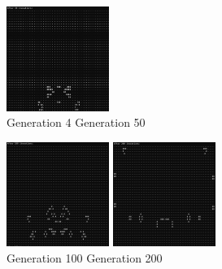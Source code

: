 \documentclass{article}
\begin{document}
\begin{enumerate}[a)]
\begin{center}
        \includegraphics[width=0.25\textwidth]{OpHw1_3a50.png} \\
        Generation 4 \hspace{3cm} Generation 50
    \end{center}
    \begin{center}
        \includegraphics[width=0.25\textwidth]{OpHw1_3a100.png}
        \includegraphics[width=0.25\textwidth]{OpHw1_3a200.png} \\
        Generation 100 \hspace{3cm} Generation 200
    \end{center}
\end{enumerate}
\end{document}
